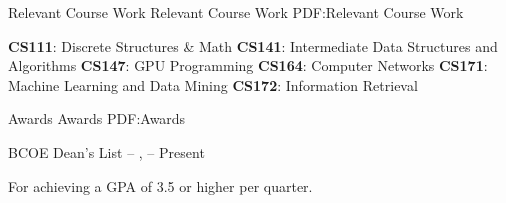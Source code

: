 \documentclass[letterpaper,MMMyyyy,nonstopmode]{simpleresumecv}
\begin{document}
\begin{Body}

\Section
{Relevant Course Work}
{Relevant Course Work}
{PDF:Relevant Course Work}

\BulletItem\textbf{CS111}: Discrete Structures \& Math
\BulletItem\textbf{CS141}: Intermediate Data Structures and Algorithms
\BulletItem\textbf{CS147}: GPU Programming
\BulletItem\textbf{CS164}: Computer Networks
\BulletItem\textbf{CS171}: Machine Learning and Data Mining
\BulletItem\textbf{CS172}: Information Retrieval

\Section
{Awards}
{Awards}
{PDF:Awards}

\BulletItem
BCOE Dean's List 
\hfill
{} --
,
 --
Present
\begin{Detail}
\Item
For achieving a GPA of 3.5 or higher per quarter.
\end{Detail}

\end{Body}
\end{document}
